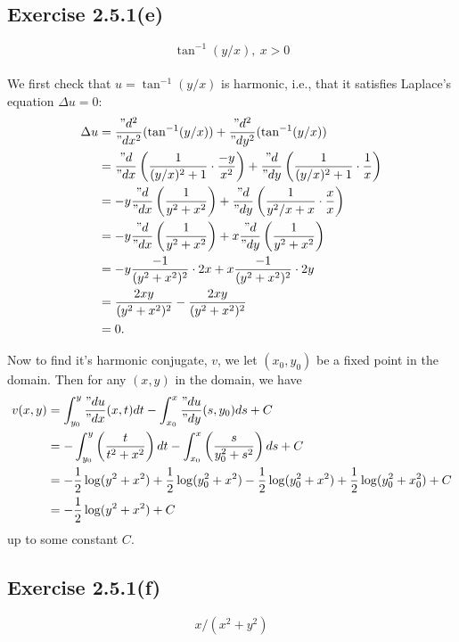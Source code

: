 \documentclass[12pt]{article}
\newenvironment{problem}
    {\begin{lrbox}{\mybox}\begin{minipage}{\textwidth-10pt}}
    {\end{minipage}\end{lrbox}\framebox[6.5in]{\usebox{\mybox}}}
\newcommand{\pd}[2]{\frac{"d#1}{"d#2}}
\newcommand{\pdn}[3]{\frac{"d^{#3}#1}{"d#2^{#3}}}
\begin{document}
\newpage
\subsection*{Exercise 2.5.1(e)}
\begin{problem}
    \[\tan^{-1}(y/x),\ x>0\]
\end{problem}
\paragraph{}

We first check that $u=\tan^{-1}(y/x)$ is harmonic, i.e., that it satisfies Laplace's equation $\Delta u=0$:
\begin{align*}
    \Delta u 
        &= \pdn{}{x}{2}(\tan^{-1}(y/x)) + \pdn{}{y}{2}(\tan^{-1}(y/x)) \\
        &= \pd{}{x}\left(\frac1{(y/x)^2 +1} \cdot \frac{-y}{x^2}\right) + \pd{}{y}\left(\frac1{(y/x)^2 +1} \cdot \frac1{x}\right) \\
        &= -y\pd{}{x}\left(\frac1{y^2 + x^2}\right) + \pd{}{y}\left(\frac1{y^2/x + x} \cdot \frac xx\right) \\
        &= -y\pd{}{x}\left(\frac1{y^2 + x^2}\right) + x\pd{}{y}\left(\frac1{y^2 + x^2}\right) \\
        &= -y\frac{-1}{(y^2 + x^2)^2}\cdot 2x + x\frac{-1}{(y^2 + x^2)^2}\cdot 2y \\
        &= \frac{2xy}{(y^2 + x^2)^2} - \frac{2xy}{(y^2 + x^2)^2} \\
        &= 0.
\end{align*}

Now to find it's harmonic conjugate, $v$, we let $(x_0,y_0)$ be a fixed point in the domain. Then for any $(x,y)$ in the domain, we have
\begin{align*}
    v(x,y)
        &= \int_{y_0}^y\pd ux (x,t) dt - \int_{x_0}^x\pd uy (s,y_0)ds + C \\
        &= -\int_{y_0}^y\left(\frac{t}{t^2 + x^2}\right) dt - \int_{x_0}^x\left(\frac{s}{y_0^2 + s^2}\right)ds + C \\
        &= -\frac12\log(y^2+x^2) + \frac12\log(y_0^2+x^2) - \frac12\log(y_0^2+x^2) + \frac12\log(y_0^2+x_0^2) + C \\
        &= -\frac12\log(y^2+x^2) + C
\end{align*}
up to some constant $C$.

\newpage
\subsection*{Exercise 2.5.1(f)}
\begin{problem}
    \[x/(x^2+y^2)\]
\end{problem}
\end{document}
